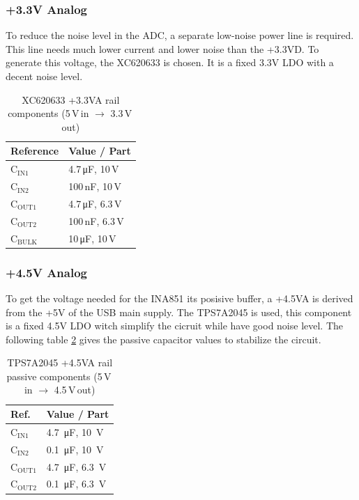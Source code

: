 \documentclass[11pt]{article}
\begin{document}
\subsubsection{+3.3V Analog}
To reduce the noise level in the ADC, a separate low-noise power line is required. This line 
needs much lower current and lower noise than the +3.3VD. To generate this voltage, the 
XC620633 is chosen. It is a fixed 3.3V LDO with a decent noise level.

\begin{table}[!htbp]
\setlength{\tabcolsep}{30pt}
\centering
\caption{XC620633 +3.3VA rail components (5\,V\,in $\rightarrow$ 3.3\,V\,out)}
\label{tab:xc620633-3v3va-bom}
\begin{tabular}{l l}
\toprule
\textbf{Reference} & \textbf{Value / Part} \\
\midrule
$\text{C}_\text{IN1}$    & 4.7\,\si{\micro\farad}, 10\,V   \\
$\text{C}_\text{IN2}$    & 100\,\si{\nano\farad}, 10\,V    \\
$\text{C}_\text{OUT1}$   & 4.7\,\si{\micro\farad}, 6.3\,V  \\
$\text{C}_\text{OUT2}$   & 100\,\si{\nano\farad}, 6.3\,V   \\
$\text{C}_\text{BULK}$   & 10\,\si{\micro\farad}, 10\,V    \\
\bottomrule
\end{tabular}
\end{table}

\subsubsection{+4.5V Analog}
To get the voltage needed for the INA851 its posisive buffer, a +4.5VA is derived from the
+5V of the USB main supply. The TPS7A2045 is used, this component is a fixed 4.5V LDO witch 
simplify the cicruit while have good noise level. The following table \ref{tab:tps7a2045_4v5va}
gives the passive capacitor values to stabilize the circuit.

\begin{table}[!htbp]
\centering
\setlength{\tabcolsep}{30pt}
\caption{TPS7A2045 +4.5VA rail passive components (5\,V\,in $\rightarrow$ 4.5\,V\,out)}
\label{tab:tps7a2045_4v5va}
\begin{tabular}{ll}
\toprule
\textbf{Ref.}             & \textbf{Value / Part}  \\
\midrule
$\text{C}_\text{IN1}$     & \SI{4.7}{\micro\farad}, \SI{10}{\volt}    \\
$\text{C}_\text{IN2}$     & \SI{0.1}{\micro\farad}, \SI{10}{\volt}    \\
$\text{C}_\text{OUT1}$    & \SI{4.7}{\micro\farad}, \SI{6.3}{\volt}   \\
$\text{C}_\text{OUT2}$    & \SI{0.1}{\micro\farad}, \SI{6.3}{\volt}   \\
\bottomrule
\end{tabular}
\end{table}
\end{document}
